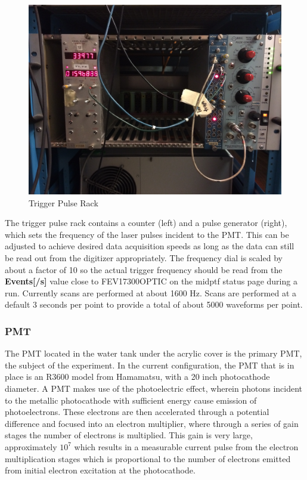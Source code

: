 \documentclass[twoside,letterpaper]{refart}
\begin{document}
\begin{figure}[!htpb] 
	\centering
	\includegraphics[scale=0.06]{images/nimCrate}
	\caption{Trigger Pulse Rack}
	\label{vme}
\end{figure}

\FloatBarrier

The trigger pulse rack contains a counter (left) and a pulse generator (right), which sets the frequency of the laser pulses incident to the PMT.  This can be adjusted to achieve desired data acquisition speeds as long as the data can still be read out from the digitizer appropriately.  The frequency dial is scaled by about a factor of 10 so the actual trigger frequency should be read from the \textbf{Events[/s]} value close to FEV17300OPTIC on the midptf status page during a run. Currently scans are performed at about 1600 Hz. Scans are performed at a default 3 seconds per point to provide a total of about 5000 waveforms per point.

\clearpage

\subsubsection{PMT}

The PMT located in the water tank under the acrylic cover is the primary PMT, the subject of the experiment.  In the current configuration, the PMT that is in place is an R3600 model from Hamamatsu, with a 20 inch photocathode diameter.  A PMT makes use of the photoelectric effect, wherein photons incident to the metallic photocathode with sufficient energy cause emission of photoelectrons.  These electrons are then accelerated through a potential difference and focused into an electron multiplier, where through a series of gain stages the number of electrons is multiplied.  This gain is very large, approximately $10^7$ which results in a measurable current pulse from the electron multiplication stages which is proportional to the number of electrons emitted from initial electron excitation at the photocathode.
\end{document}

